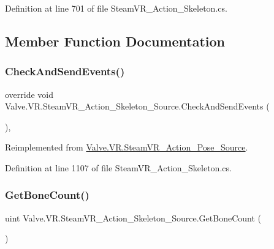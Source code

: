 Definition at line 701 of file Steam\+V\+R\+\_\+\+Action\+\_\+\+Skeleton.\+cs.



\subsection{Member Function Documentation}
\mbox{\label{class_valve_1_1_v_r_1_1_steam_v_r___action___skeleton___source_a28767b72b6df82708843c477b3740ccb}} 
\subsubsection{\texorpdfstring{CheckAndSendEvents()}{CheckAndSendEvents()}}
{\footnotesize\ttfamily override void Valve.\+V\+R.\+Steam\+V\+R\+\_\+\+Action\+\_\+\+Skeleton\+\_\+\+Source.\+Check\+And\+Send\+Events (\begin{DoxyParamCaption}{ }\end{DoxyParamCaption})\hspace{0.3cm}{\ttfamily [protected]}, {\ttfamily [virtual]}}



Reimplemented from \mbox{\hyperlink{class_valve_1_1_v_r_1_1_steam_v_r___action___pose___source_a3a0883dd58cb29e7cf549199e858c69f}{Valve.\+V\+R.\+Steam\+V\+R\+\_\+\+Action\+\_\+\+Pose\+\_\+\+Source}}.



Definition at line 1107 of file Steam\+V\+R\+\_\+\+Action\+\_\+\+Skeleton.\+cs.

\mbox{\label{class_valve_1_1_v_r_1_1_steam_v_r___action___skeleton___source_ae5740f83d6f5c8d12f81037674847d3c}} 
\subsubsection{\texorpdfstring{GetBoneCount()}{GetBoneCount()}}
{\footnotesize\ttfamily uint Valve.\+V\+R.\+Steam\+V\+R\+\_\+\+Action\+\_\+\+Skeleton\+\_\+\+Source.\+Get\+Bone\+Count (\begin{DoxyParamCaption}{ }\end{DoxyParamCaption})}



